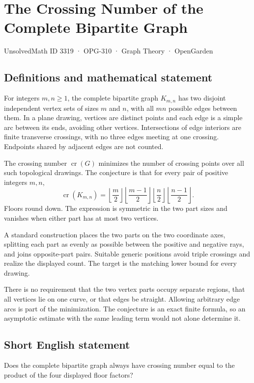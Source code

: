\documentclass[11pt,a4paper]{article}
\begin{document}
\section*{The Crossing Number of the Complete Bipartite Graph}\label{3319}
{\small UnsolvedMath ID 3319 · OPG-310 · Graph Theory · OpenGarden}
\subsection{Definitions and mathematical statement}
For integers $m,n\ge1$, the complete bipartite graph $K_{m,n}$ has
two disjoint independent vertex sets of sizes $m$ and $n$, with all
$mn$ possible edges between them. In a plane drawing, vertices are
distinct points and each edge is a simple arc between its ends,
avoiding other vertices. Intersections of edge interiors are finite
transverse crossings, with no three edges meeting at one crossing.
Endpoints shared by adjacent edges are not counted.

The crossing number $\operatorname{cr}(G)$ minimizes the number of
crossing points over all such topological drawings. The conjecture
is that for every pair of positive integers $m,n$,
\[
 \operatorname{cr}(K_{m,n})=
       \left\lfloor\frac m2\right\rfloor
       \left\lfloor\frac{m-1}2\right\rfloor
       \left\lfloor\frac n2\right\rfloor
       \left\lfloor\frac{n-1}2\right\rfloor.
\]
Floors round down. The expression is symmetric in the two part sizes
and vanishes when either part has at most two vertices.

A standard construction places the two parts on the two coordinate
axes, splitting each part as evenly as possible between the positive
and negative rays, and joins opposite-part pairs. Suitable generic
positions avoid triple crossings and realize the displayed count.
The target is the matching lower bound for every drawing.

There is no requirement that the two vertex parts occupy separate
regions, that all vertices lie on one curve, or that edges be
straight. Allowing arbitrary edge arcs is part of the minimization.
The conjecture is an exact finite formula, so an asymptotic estimate
with the same leading term would not alone determine it.
\subsection{Short English statement}
Does the complete bipartite graph always have crossing number equal to the product of the four displayed floor factors?
\end{document}
